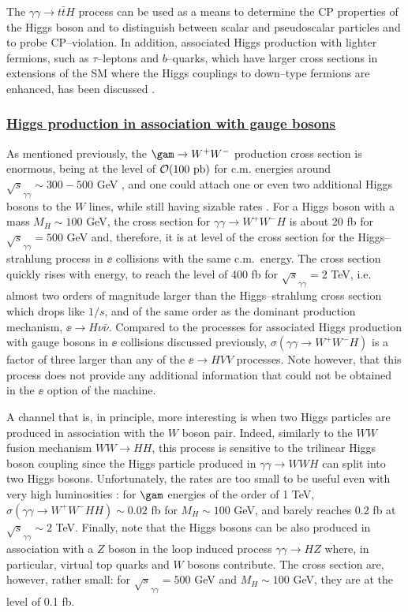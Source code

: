 The $\gamma \gamma \to t\bar{t}H$ process can be used as a means to
determine the CP properties of the Higgs boson and to distinguish between
scalar and pseudoscalar particles and to probe CP--violation.  
In addition, associated Higgs production with lighter fermions, such as
$\tau$--leptons and $b$--quarks, which have larger cross sections in extensions
of the SM where the Higgs couplings to down--type fermions are enhanced, has
been discussed \cite{bb-H-gamma}.  

\subsubsection*{\underline{Higgs production in association with gauge 
bosons}}

As mentioned previously, the $\gam \to W^+ W^-$ production cross section is
enormous, being at the level of ${\cal O}(100~{\rm pb})$ for c.m. energies
around $\sqrt{s}_{\gamma \gamma} \sim 300-500$ GeV \cite{gam-WW}, and one could
attach one or even two additional Higgs bosons to the $W$ lines, while still
having sizable rates \cite{gam-WWH}. For a Higgs boson with a mass $M_H \sim
100$ GeV, the cross section for $\gamma \gamma \to W^+W^-H$ is about 20 fb for
$\sqrt{s}_{\gamma \gamma}= 500$ GeV and,  therefore, it is at level of the
cross section for the Higgs--strahlung process in $\ee$ collisions with the
same c.m.~energy. The cross section quickly rises with energy, to reach the
level of 400 fb for $\sqrt{s}_{\gamma \gamma}=2$ TeV, i.e. almost two orders of
magnitude larger than the Higgs--strahlung cross section which drops like
$1/s$, and of the same order as the dominant production mechanism, $\ee \to
H\nu \bar{\nu}$.  Compared to the processes for  associated Higgs production
with gauge bosons in $\ee$ collisions discussed previously, $\sigma( \gamma
\gamma \to W^+W^-H)$ is a factor of three larger than any of the $\ee \to HVV$
processes.  Note however, that this process does not provide any additional
information that could not be obtained in the $\ee$ option of the machine. \s

A channel that is, in principle, more interesting is when two Higgs particles
are produced in association with the $W$ boson pair. Indeed, similarly to the
$WW$ fusion mechanism $WW \to HH$, this process is sensitive to the trilinear
Higgs boson coupling since the Higgs particle produced in $\gamma \gamma \to
WWH$ can split into two Higgs bosons.  Unfortunately, the rates are too small
to be useful even with very high luminosities \cite{gam-WWHH}: for $\gam$
energies of the order of 1 TeV, $\sigma (\gamma \gamma \to W^+W^- HH) \sim
0.02$ fb for $M_H \sim 100$ GeV, and barely reaches 0.2 fb at $\sqrt{s}_{\gamma
\gamma}\sim 2$ TeV. Finally, note that the Higgs bosons can be also produced in
association with a $Z$ boson in the loop induced process $\gamma
\gamma \to HZ$ \cite{gam-HZ} where, in particular,  virtual top quarks and $W$ 
bosons contribute.  The cross section are, however, rather small: for
$\sqrt{s}_{\gamma \gamma}= 500$ GeV and $M_H \sim 100$ GeV, they are at the
level of 0.1 fb.  

